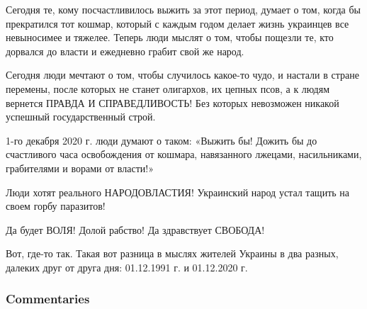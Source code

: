Сегодня те, кому посчастливилось выжить за этот период, думает о том, когда бы
прекратился тот кошмар, который с каждым годом делает жизнь украинцев все
невыносимее и тяжелее. Теперь люди мыслят о том, чтобы пощезли те, кто дорвался
до власти и ежедневно грабит свой же народ. 

Сегодня люди мечтают о том, чтобы случилось какое-то чудо, и настали в стране
перемены, после которых не станет олигархов, их цепных псов, а к людям вернется
ПРАВДА И СПРАВЕДЛИВОСТЬ! Без которых невозможен никакой успешный
государственный строй.

1-го декабря 2020 г. люди думают о таком: «Выжить бы! Дожить бы до счастливого
часа освобождения от кошмара, навязанного лжецами, насильниками, грабителями и
ворами от власти!»

Люди хотят реального НАРОДОВЛАСТИЯ! Украинский народ устал тащить на своем
горбу паразитов!

Да будет ВОЛЯ! Долой рабство! Да здравствует СВОБОДА!

Вот, где-то так. Такая вот разница в мыслях жителей Украины в два разных,
далеких друг от друга дня: 01.12.1991 г. и 01.12.2020 г.

\subsubsection{Commentaries}

